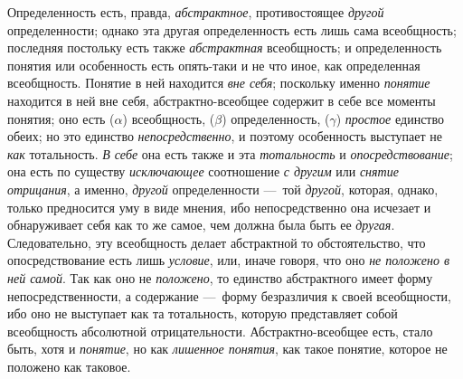 \documentclass[twoside]{article}
\begin{document}
{{Определенность есть, правда,
{\em абстрактное},
противостоящее
{\em другой}
определенности; однако эта другая определенность есть лишь
сама всеобщность; последняя постольку есть также
{\em абстрактная}
всеобщность; и определенность понятия или особенность есть
опять-таки и не что иное, как определенная всеобщность. Понятие в ней
находится {\em вне себя};
поскольку именно
{\em понятие} находится в
ней вне себя, абстрактно-всеобщее содержит в себе все моменты понятия; оно
есть ($\alpha $) всеобщность, ($\beta $) определенность, ($\gamma $)
{\em простое} единство
обеих; но это единство
{\em непосредственно}, и
поэтому особенность выступает не
{\em как} тотальность.
{\em В себе} она есть
также и эта {\em тотальность}
и {\em опосредствование};
она есть по существу
{\em исключающее}
соотношение {\em с
другим} или {\em снятие
отрицания}, а именно,
{\em другой}
определенности —~той
{\em другой}, которая,
однако, только предносится уму в виде мнения, ибо непосредственно она
исчезает и обнаруживает себя как то же самое, чем должна была быть ее
{\em другая}.
Следовательно, эту всеобщность делает абстрактной то
обстоятельство, что опосредствование есть лишь
{\em условие}, или, иначе
говоря, что оно {\em не положено в ней
самой}. Так как оно не
{\em положено}, то
единство абстрактного имеет форму непосредственности, а содержание
—~форму безразличия к своей всеобщности, ибо оно не выступает
как та тотальность, которую представляет собой всеобщность абсолютной
отрицательности. Абстрактно-всеобщее есть, стало быть, хотя и
{\em понятие}, но как
{\em лишенное понятия},
как такое понятие, которое не положено как таковое.

}}
\end{document}
